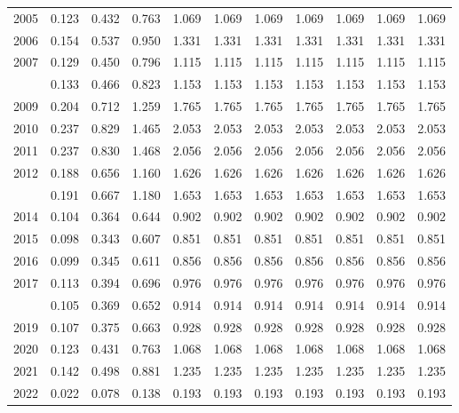 \documentclass[
]{article}
\begin{document}
\begin{longtable}[t]{lrrrrrrrrrr}
2005 & 0.123 & 0.432 & 0.763 & 1.069 & 1.069 & 1.069 & 1.069 & 1.069 & 1.069 & 1.069\\
2006 & 0.154 & 0.537 & 0.950 & 1.331 & 1.331 & 1.331 & 1.331 & 1.331 & 1.331 & 1.331\\
2007 & 0.129 & 0.450 & 0.796 & 1.115 & 1.115 & 1.115 & 1.115 & 1.115 & 1.115 & 1.115\\
\addlinespace
2008 & 0.133 & 0.466 & 0.823 & 1.153 & 1.153 & 1.153 & 1.153 & 1.153 & 1.153 & 1.153\\
2009 & 0.204 & 0.712 & 1.259 & 1.765 & 1.765 & 1.765 & 1.765 & 1.765 & 1.765 & 1.765\\
2010 & 0.237 & 0.829 & 1.465 & 2.053 & 2.053 & 2.053 & 2.053 & 2.053 & 2.053 & 2.053\\
2011 & 0.237 & 0.830 & 1.468 & 2.056 & 2.056 & 2.056 & 2.056 & 2.056 & 2.056 & 2.056\\
2012 & 0.188 & 0.656 & 1.160 & 1.626 & 1.626 & 1.626 & 1.626 & 1.626 & 1.626 & 1.626\\
\addlinespace
2013 & 0.191 & 0.667 & 1.180 & 1.653 & 1.653 & 1.653 & 1.653 & 1.653 & 1.653 & 1.653\\
2014 & 0.104 & 0.364 & 0.644 & 0.902 & 0.902 & 0.902 & 0.902 & 0.902 & 0.902 & 0.902\\
2015 & 0.098 & 0.343 & 0.607 & 0.851 & 0.851 & 0.851 & 0.851 & 0.851 & 0.851 & 0.851\\
2016 & 0.099 & 0.345 & 0.611 & 0.856 & 0.856 & 0.856 & 0.856 & 0.856 & 0.856 & 0.856\\
2017 & 0.113 & 0.394 & 0.696 & 0.976 & 0.976 & 0.976 & 0.976 & 0.976 & 0.976 & 0.976\\
\addlinespace
2018 & 0.105 & 0.369 & 0.652 & 0.914 & 0.914 & 0.914 & 0.914 & 0.914 & 0.914 & 0.914\\
2019 & 0.107 & 0.375 & 0.663 & 0.928 & 0.928 & 0.928 & 0.928 & 0.928 & 0.928 & 0.928\\
2020 & 0.123 & 0.431 & 0.763 & 1.068 & 1.068 & 1.068 & 1.068 & 1.068 & 1.068 & 1.068\\
2021 & 0.142 & 0.498 & 0.881 & 1.235 & 1.235 & 1.235 & 1.235 & 1.235 & 1.235 & 1.235\\
2022 & 0.022 & 0.078 & 0.138 & 0.193 & 0.193 & 0.193 & 0.193 & 0.193 & 0.193 & 0.193\\*
\end{longtable}
\end{document}
